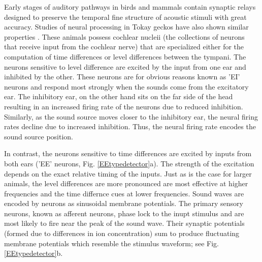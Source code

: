 Early stages of auditory pathways in birds and mammals contain synaptic relays designed to preserve the temporal fine structure of 
acoustic stimuli with great accuracy.  Studies of neural processing in Tokay geckos have also shown similar properties \cite{dalsgaardtangcarr}.
These animals possess cochlear nucleii (the collections of neurons that receive input from the cochlear nerve) that are specialized either for
the computation of time differences or level differences between the tympani. The neurons sensitive to level difference are excited by the 
input from one ear and inhibited by the other. These neurons are for obvious reasons known as 'EI' neurons and respond most strongly when the
sounds come from the excitatory ear. The inhibitory ear, on the other hand sits on the far side of the head resulting in an increased firing
rate of the neurons due to reduced inhibition. Similarly, as the sound source moves closer to the inhibitory ear, the neural firing rates decline
due to increased inhibition. Thus, the neural firing rate encodes the sound source position. 

In contrast, the neurons sensitive to time differences are excited by inputs from both ears ('EE' neurons, Fig. \ref{EEtypedetector}a). The strength of the
excitation depends on the exact relative timing of the inputs. Just as is the case for larger animals, the level
differences are more pronounced are most effective at higher frequencies and the time differnce cues at lower frequencies. Sound waves are encoded
by neurons as sinusoidal membrane potentials. The primary sensory neurons, known as afferent neurons, phase lock to the inupt
stimulus and are most likely to fire near the peak of the sound wave. Their synaptic potentials (formed due to differences
in ion concentration) sum to produce fluctuating membrane potentials which resemble the stimulus waveform; see Fig. \ref{EEtypedetector}b. 

